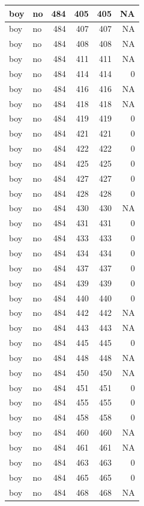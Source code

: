 \documentclass[man]{apa6}
\begin{document}
\begin{tabular}{l|l|r|r|r|r}
\hline
boy & no & 484 & 405 & 405 & NA\\
\hline
boy & no & 484 & 407 & 407 & NA\\
\hline
boy & no & 484 & 408 & 408 & NA\\
\hline
boy & no & 484 & 411 & 411 & NA\\
\hline
boy & no & 484 & 414 & 414 & 0\\
\hline
boy & no & 484 & 416 & 416 & NA\\
\hline
boy & no & 484 & 418 & 418 & NA\\
\hline
boy & no & 484 & 419 & 419 & 0\\
\hline
boy & no & 484 & 421 & 421 & 0\\
\hline
boy & no & 484 & 422 & 422 & 0\\
\hline
boy & no & 484 & 425 & 425 & 0\\
\hline
boy & no & 484 & 427 & 427 & 0\\
\hline
boy & no & 484 & 428 & 428 & 0\\
\hline
boy & no & 484 & 430 & 430 & NA\\
\hline
boy & no & 484 & 431 & 431 & 0\\
\hline
boy & no & 484 & 433 & 433 & 0\\
\hline
boy & no & 484 & 434 & 434 & 0\\
\hline
boy & no & 484 & 437 & 437 & 0\\
\hline
boy & no & 484 & 439 & 439 & 0\\
\hline
boy & no & 484 & 440 & 440 & 0\\
\hline
boy & no & 484 & 442 & 442 & NA\\
\hline
boy & no & 484 & 443 & 443 & NA\\
\hline
boy & no & 484 & 445 & 445 & 0\\
\hline
boy & no & 484 & 448 & 448 & NA\\
\hline
boy & no & 484 & 450 & 450 & NA\\
\hline
boy & no & 484 & 451 & 451 & 0\\
\hline
boy & no & 484 & 455 & 455 & 0\\
\hline
boy & no & 484 & 458 & 458 & 0\\
\hline
boy & no & 484 & 460 & 460 & NA\\
\hline
boy & no & 484 & 461 & 461 & NA\\
\hline
boy & no & 484 & 463 & 463 & 0\\
\hline
boy & no & 484 & 465 & 465 & 0\\
\hline
boy & no & 484 & 468 & 468 & NA\\

\end{tabular}
\end{document}
